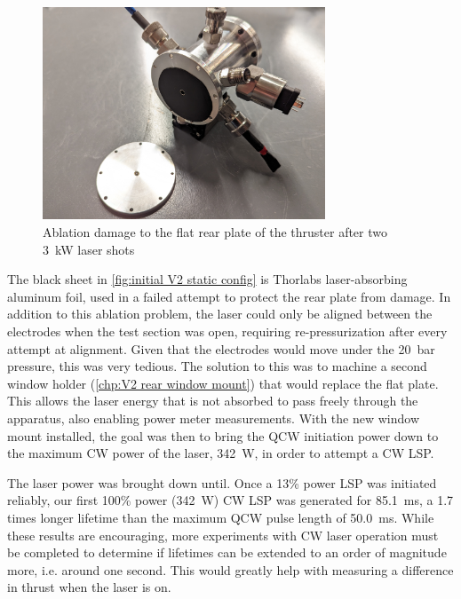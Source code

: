 \begin{figure}[!ht]
    \centering
    \includegraphics[width=0.75\textwidth]{assets/4 experiments/V2 test damage.jpg}
    \caption{Ablation damage to the flat rear plate of the thruster after two \qty{3}{kW} laser shots}
    \label{fig:initial V2 static config}
\end{figure}

The black sheet in \autoref{fig:initial V2 static config} is Thorlabs laser-absorbing aluminum foil, used in a failed attempt to protect the rear plate from damage. In addition to this ablation problem, the laser could only be aligned between the electrodes when the test section was open, requiring re-pressurization after every attempt at alignment. Given that the electrodes would move under the \qty{20}{bar} pressure, this was very tedious. The solution to this was to machine a second window holder (\autoref{chp:V2 rear window mount}) that would replace the flat plate. This allows the laser energy that is not absorbed to pass freely through the apparatus, also enabling power meter measurements. With the new window mount installed, the goal was then to bring the QCW initiation power down to the maximum CW power of the laser, \qty{342}{W}, in order to attempt a CW LSP.

The laser power was brought down  until. Once a 13\% power  LSP was initiated reliably, our first 100\% power (\qty{342}{W}) CW LSP was generated for \qty{85.1}{ms}, a 1.7 times longer lifetime than the maximum QCW pulse length of \qty{50.0}{ms}. While these results are encouraging, more experiments with CW laser operation must be completed to determine if lifetimes can be extended to an order of magnitude more, i.e. around one second. This would greatly help with measuring a difference in thrust when the laser is on.


